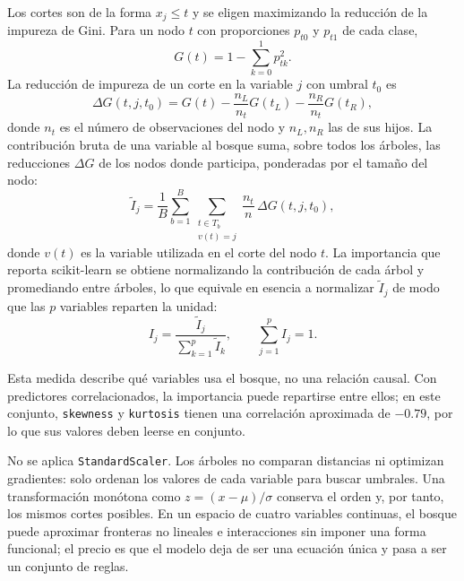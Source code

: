 \documentclass[conference]{IEEEtran}
\begin{document}
    Los cortes son de la forma $x_j\le t$ y se eligen maximizando la reducción de la impureza de Gini. Para un nodo $t$ con proporciones $p_{t0}$ y $p_{t1}$ de cada clase,
    \begin{equation}
    	G(t)=1-\sum_{k=0}^{1}p_{tk}^{2}.
    	\label{eq:gini}
    \end{equation}
    La reducción de impureza de un corte en la variable $j$ con umbral $t_0$ es
    \begin{equation}
    	\Delta G(t,j,t_0)=G(t)-\frac{n_L}{n_t}G(t_L)-\frac{n_R}{n_t}G(t_R),
    	\label{eq:delta-gini}
    \end{equation}
    donde $n_t$ es el número de observaciones del nodo y $n_L,n_R$ las de sus hijos. La contribución bruta de una variable al bosque suma, sobre todos los árboles, las reducciones $\Delta G$ de los nodos donde participa, ponderadas por el tamaño del nodo:
    \begin{equation}
    	\tilde{I}_j=\frac{1}{B}\sum_{b=1}^{B}\sum_{\substack{t\in T_b\\ v(t)=j}}
    	\frac{n_t}{n}\,\Delta G(t,j,t_0),
    	\label{eq:rf-importance-raw}
    \end{equation}
    donde $v(t)$ es la variable utilizada en el corte del nodo $t$.
    La importancia que reporta scikit-learn se obtiene normalizando la contribución de cada árbol y promediando entre árboles, lo que equivale en esencia a normalizar $\tilde{I}_j$ de modo que las $p$ variables reparten la unidad:
    \begin{equation}
    	I_j=\frac{\tilde{I}_j}{\sum_{k=1}^{p}\tilde{I}_k},
    	\qquad \sum_{j=1}^{p}I_j=1.
    	\label{eq:rf-importance}
    \end{equation}
    
    Esta medida describe qué variables usa el bosque, no una relación causal. Con predictores correlacionados, la importancia puede repartirse entre ellos; en este conjunto, \texttt{skewness} y \texttt{kurtosis} tienen una correlación aproximada de $-0.79$, por lo que sus valores deben leerse en conjunto.
    
    No se aplica \texttt{StandardScaler}. Los árboles no comparan distancias ni optimizan gradientes: solo ordenan los valores de cada variable para buscar umbrales. Una transformación monótona como $z=(x-\mu)/\sigma$ conserva el orden y, por tanto, los mismos cortes posibles. En un espacio de cuatro variables continuas, el bosque puede aproximar fronteras no lineales e interacciones sin imponer una forma funcional; el precio es que el modelo deja de ser una ecuación única y pasa a ser un conjunto de reglas.
    
\end{document}
